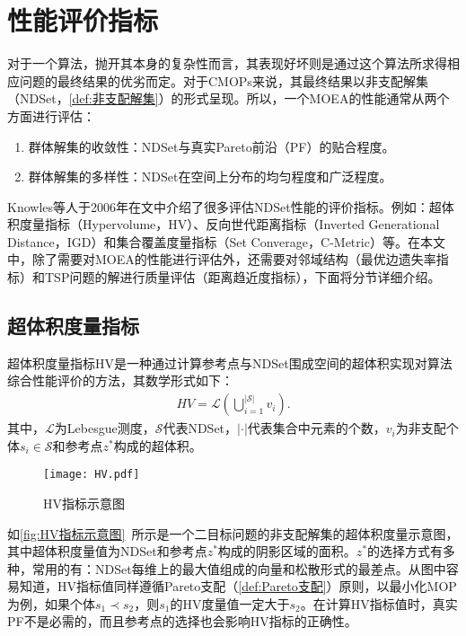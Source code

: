 \section{性能评价指标}
\label{sec:背景介绍:性能评价指标}
对于一个算法，抛开其本身的复杂性而言，其表现好坏则是通过这个算法所求得相应问题的最终结果的优劣而定。对于CMOPs来说，其最终结果以非支配解集（NDSet，\autoref{def:非支配解集}）的形式呈现。所以，一个MOEA的性能通常从两个方面进行评估：
\begin{enumerate}
    \item 群体解集的收敛性：NDSet与真实Pareto前沿（PF）的贴合程度。
    \item 群体解集的多样性：NDSet在空间上分布的均匀程度和广泛程度。
\end{enumerate}
\par
Knowles等人于2006年在文中\cite{knowles2006tutorial}介绍了很多评估NDSet性能的评价指标。例如：超体积度量指标（Hypervolume，HV）\cite{zitzler1999multiobjective}、反向世代距离指标（Inverted Generational Distance，IGD）\cite{czyzzak1998pareto}和集合覆盖度量指标（Set Converage，C-Metric）\cite{zitzler1999multiobjective}等。在本文中，除了需要对MOEA的性能进行评估外，还需要对邻域结构（最优边遗失率指标\cite{helsgaun2018using}）和TSP问题的解进行质量评估（距离趋近度指标\cite{helsgaun2018using}），下面将分节详细介绍。

\subsection{超体积度量指标}
\label{subsec:背景介绍:性能评价指标:超体积度量指标}
超体积度量指标HV是一种通过计算参考点与NDSet围成空间的超体积实现对算法综合性能评价的方法，其数学形式如下：
\begin{align}
    \label{eq:HV}
    HV = \mathcal{L} (\bigcup_{i=1}^{|\mathcal{S}|} v_i).
\end{align}
其中，$\mathcal{L}$为Lebesgue测度，$\mathcal{S}$代表NDSet，$| \cdot  \vert $代表集合中元素的个数，$v_i$为非支配个体$s_i \in \mathcal{S}$和参考点$z^*$构成的超体积。
\begin{figure}[htb]
    \texttt{[image: HV.pdf]}
    \caption[HV指标示意图]{HV指标示意图}
    \label{fig:HV指标示意图}
\end{figure}
\par
如\autoref{fig:HV指标示意图}~所示是一个二目标问题的非支配解集的超体积度量示意图，其中超体积度量值为NDSet和参考点$z^*$构成的阴影区域的面积。$z^*$的选择方式有多种，常用的有：NDSet每维上的最大值组成的向量和松散形式的最差点\cite{deb2010toward}。从图中容易知道，HV指标值同样遵循Pareto支配（\autoref{def:Pareto支配}）原则，以最小化MOP为例，如果个体$s_1 \prec s_2$，则$s_1$的HV度量值一定大于$s_2$。在计算HV指标值时，真实PF不是必需的，而且参考点的选择也会影响HV指标的正确性\cite{zheng2007mop}。


